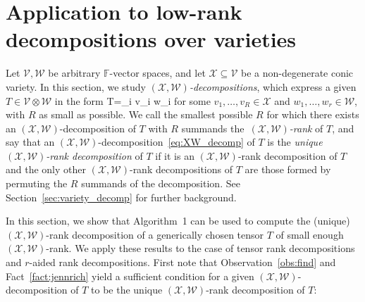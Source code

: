 \documentclass[11pt]{article}
\theoremstyle{definition}
\newcommand{\field}{\mathbb{F}}
\newcommand\X{\mathcal{X}}
\newcommand\W{\mathcal{W}}
\newcommand\A{\mathcal{A}}
\newcommand\V{\mathcal{V}}
\newcommand{\bnote}[1]{}
\def\ba#1\ea{\begin{align}#1\end{align}}
\begin{document}
\section{Application to low-rank decompositions over varieties}\label{sec:tensors}

\bnote{All Theorems/Corollaries in this section tweaked}
Let $\V, \W$ be arbitrary $\field$-vector spaces, and let $\X \subseteq \V$ be a non-degenerate conic variety.
In this section, we study $(\X,\W)$\textit{-decompositions},
which express a given $T \in \V \otimes \W$ in the form
\ba\label{eq:XW_decomp}
T=\sum_{i \in [R]} v_i \otimes w_i
\ea
for some $v_1,\dots, v_R \in \X$ and $w_1,\dots, w_r \in \W$, with $R$ as small as possible. 
%
We call the smallest possible $R$ for which there exists an $(\X,\W)$-decomposition of $T$ with $R$ summands the~\textit{$(\X, \W)$-rank} of $T$, and say that an $(\X,\W)$-decomposition~\eqref{eq:XW_decomp} of $T$ is the \textit{unique $(\X,\W)$-rank decomposition} of $T$ if it is an $(\X,\W)$-rank decomposition of $T$ and the only other $(\X,\W)$-rank decompositions of $T$ are those formed by permuting the $R$ summands of the decomposition. See Section~\ref{sec:variety_decomp} for further background.

In this section, we show that Algorithm~1 can be used to compute the (unique) $(\X,\W)$-rank decomposition of a generically chosen tensor $T$ of small enough $(\X,\W)$-rank. We apply these results to the case of tensor rank decompositions and $r$-aided rank decompositions. First note that Observation~\ref{obs:find} and Fact~\ref{fact:jennrich} yield a sufficient condition for a given $(\X,\W)$-decomposition of $T$ to be the unique $(\X,\W)$-rank decomposition of $T$:
\end{document}
